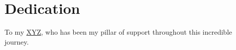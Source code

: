 \chapter*{Dedication}
\vspace{1cm}
To my \underline{XYZ}, who has been my pillar of support throughout this incredible journey.
\vspace{1cm}